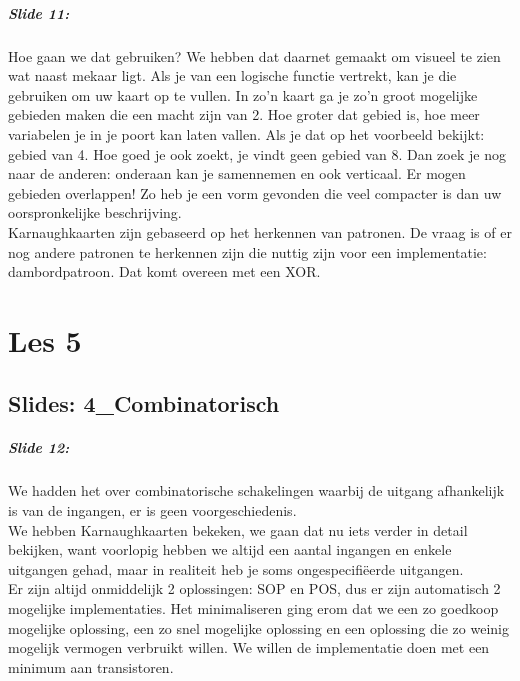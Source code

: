 \documentclass[10pt,a4paper]{book}
\begin{document}
\paragraph{Slide 11:} Hoe gaan we dat gebruiken? We hebben dat daarnet gemaakt om visueel te zien wat naast mekaar ligt. Als je van een logische functie vertrekt, kan je die gebruiken om uw kaart op te vullen. In zo'n kaart ga je zo'n groot mogelijke gebieden maken die een macht zijn van 2. Hoe groter dat gebied is, hoe meer variabelen je in je poort kan laten vallen. Als je dat op het voorbeeld bekijkt: gebied van 4. Hoe goed je ook zoekt, je vindt geen gebied van 8. Dan zoek je nog naar de anderen: onderaan kan je samennemen en ook verticaal. Er mogen gebieden overlappen! Zo heb je een vorm gevonden die veel compacter is dan uw oorspronkelijke beschrijving.\\
Karnaughkaarten zijn gebaseerd op het herkennen van patronen. De vraag is of er nog andere patronen te herkennen zijn die nuttig zijn voor een implementatie: dambordpatroon. Dat komt overeen met een XOR. 

\chapter{Les 5}
\section{Slides: 4\_Combinatorisch}

\paragraph{Slide 12:} We hadden het over combinatorische schakelingen waarbij de uitgang afhankelijk is van de ingangen, er is geen voorgeschiedenis.\\
We hebben Karnaughkaarten bekeken, we gaan dat nu iets verder in detail bekijken, want voorlopig hebben we altijd een aantal ingangen en enkele uitgangen gehad, maar in realiteit heb je soms ongespecifi\"eerde uitgangen. \\
Er zijn altijd onmiddelijk 2 oplossingen: SOP en POS, dus er zijn automatisch 2 mogelijke implementaties. Het minimaliseren ging erom dat we een zo goedkoop mogelijke oplossing, een zo snel mogelijke oplossing en een oplossing die zo weinig mogelijk vermogen verbruikt willen.  We willen de implementatie doen met een minimum aan transistoren.
\end{document}
